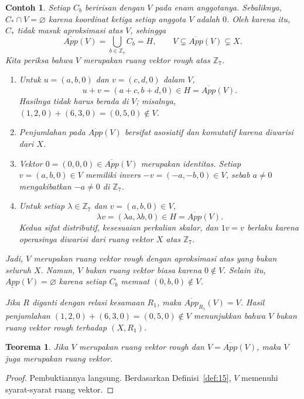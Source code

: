 \documentclass[a4paper,11pt]{article}
\theoremstyle{plain}
\newtheorem{contoh}[definisi]{Contoh}
\newtheorem{teorema}[definisi]{Teorema}
\newcommand{\Z}{\mathbb{Z}}
\newcommand{\upp}[1]{\overline{App}(#1)}
\newcommand{\lowp}[1]{\underline{App}(#1)}
\begin{document}
\begin{contoh}
      Setiap $C_b$ beririsan dengan $V$ pada enam anggotanya.
      Sebaliknya, $C_*\cap V=\varnothing$ karena koordinat ketiga
      setiap anggota $V$ adalah $0$. Oleh karena itu, $C_*$ tidak
      masuk aproksimasi atas $V$, sehingga
      \[
            \upp{V}=\bigcup_{b\in\Z_7}C_b=H,
            \qquad V\subsetneq\upp{V}\subsetneq X.
      \]
      Kita periksa bahwa $V$ merupakan ruang vektor rough atas $\Z_7$.
      \begin{enumerate}
            \item Untuk $u=(a,b,0)$ dan $v=(c,d,0)$ dalam $V$,
                  \[
                        u+v=(a+c,b+d,0)\in H=\upp{V}.
                  \]
                  Hasilnya tidak harus berada di $V$; misalnya,
                  $(1,2,0)+(6,3,0)=(0,5,0)\notin V$.
            \item Penjumlahan pada $\upp{V}$ bersifat asosiatif dan
                  komutatif karena diwarisi dari $X$.
            \item Vektor $0=(0,0,0)\in\upp{V}$ merupakan identitas.
                  Setiap $v=(a,b,0)\in V$ memiliki invers
                  $-v=(-a,-b,0)\in V$, sebab $a\ne0$ mengakibatkan
                  $-a\ne0$ di $\Z_7$.
            \item Untuk setiap $\lambda\in\Z_7$ dan $v=(a,b,0)\in V$,
                  \[
                        \lambda v=(\lambda a,\lambda b,0)\in H=\upp{V}.
                  \]
                  Kedua sifat distributif, kesesuaian perkalian skalar,
                  dan $1v=v$ berlaku karena operasinya diwarisi dari
                  ruang vektor $X$ atas $\Z_7$.
      \end{enumerate}
      Jadi, $V$ merupakan ruang vektor rough dengan aproksimasi atas
      yang bukan seluruh $X$. Namun, $V$ bukan ruang vektor biasa
      karena $0\notin V$. Selain itu, $\lowp{V}=\varnothing$ karena
      setiap $C_b$ memuat $(0,b,0)\notin V$.

      Jika $R$ diganti dengan relasi kesamaan $R_1$, maka
      $\overline{App}_{R_1}(V)=V$. Hasil penjumlahan
      $(1,2,0)+(6,3,0)=(0,5,0)\notin V$ menunjukkan bahwa
      $V$ bukan ruang vektor rough terhadap $(X,R_1)$.
\end{contoh}

\begin{teorema}\label{thm:21}
      Jika $V$ merupakan ruang vektor rough dan $V=\upp{V}$, maka $V$
      juga merupakan ruang vektor.
\end{teorema}
\begin{proof}
      Pembuktiannya langsung. Berdasarkan Definisi~\ref{def:15}, $V$
      memenuhi syarat-syarat ruang vektor.
\end{proof}
\end{document}
